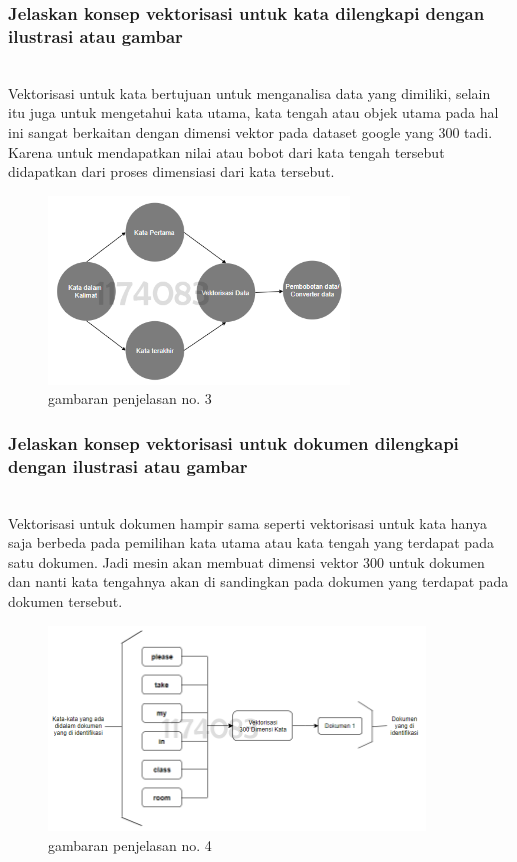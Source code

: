 \subsubsection{Jelaskan konsep vektorisasi untuk kata dilengkapi dengan ilustrasi atau gambar}
\hfill\\
Vektorisasi untuk kata bertujuan untuk menganalisa data yang dimiliki, selain itu juga untuk mengetahui kata utama, kata tengah atau objek utama pada hal ini sangat berkaitan dengan dimensi vektor pada dataset google yang 300 tadi. Karena untuk mendapatkan nilai atau bobot dari kata tengah tersebut didapatkan dari proses dimensiasi dari kata tersebut.
\begin{figure}[H]
	\centering
	\includegraphics[width=8cm]{figures/1174083/figures5/3.png}
	\caption{gambaran penjelasan no. 3}
\end{figure}

\subsubsection{Jelaskan konsep vektorisasi untuk dokumen dilengkapi dengan ilustrasi atau gambar}
\hfill\\
Vektorisasi untuk dokumen hampir sama seperti vektorisasi untuk kata hanya saja berbeda pada pemilihan kata utama atau kata tengah yang terdapat pada satu dokumen. Jadi mesin akan membuat dimensi vektor 300 untuk dokumen dan nanti kata tengahnya akan di sandingkan pada dokumen yang terdapat pada dokumen tersebut.
\begin{figure}[H]
	\centering
	\includegraphics[width=10cm]{figures/1174083/figures5/4.png}
	\caption{gambaran penjelasan no. 4}
\end{figure}

